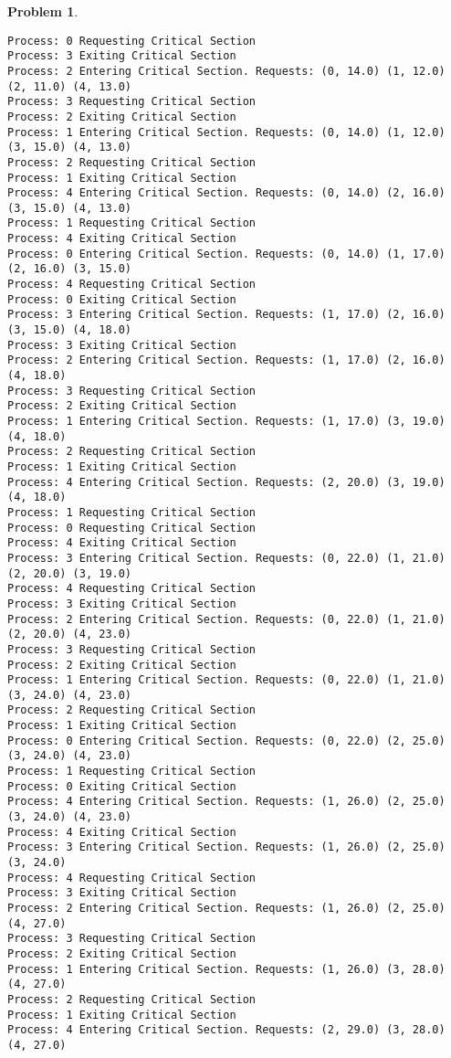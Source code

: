 \documentclass{article}
\theoremstyle{problemstyle}
\newtheorem{problem}{Problem}
\begin{document}
\begin{problem}
\begin{enumerate}[label=(\alph*)]
\begin{lstlisting}
Process: 0 Requesting Critical Section
Process: 3 Exiting Critical Section
Process: 2 Entering Critical Section. Requests: (0, 14.0) (1, 12.0) (2, 11.0) (4, 13.0)
Process: 3 Requesting Critical Section
Process: 2 Exiting Critical Section
Process: 1 Entering Critical Section. Requests: (0, 14.0) (1, 12.0) (3, 15.0) (4, 13.0)
Process: 2 Requesting Critical Section
Process: 1 Exiting Critical Section
Process: 4 Entering Critical Section. Requests: (0, 14.0) (2, 16.0) (3, 15.0) (4, 13.0)
Process: 1 Requesting Critical Section
Process: 4 Exiting Critical Section
Process: 0 Entering Critical Section. Requests: (0, 14.0) (1, 17.0) (2, 16.0) (3, 15.0)
Process: 4 Requesting Critical Section
Process: 0 Exiting Critical Section
Process: 3 Entering Critical Section. Requests: (1, 17.0) (2, 16.0) (3, 15.0) (4, 18.0)
Process: 3 Exiting Critical Section
Process: 2 Entering Critical Section. Requests: (1, 17.0) (2, 16.0) (4, 18.0)
Process: 3 Requesting Critical Section
Process: 2 Exiting Critical Section
Process: 1 Entering Critical Section. Requests: (1, 17.0) (3, 19.0) (4, 18.0)
Process: 2 Requesting Critical Section
Process: 1 Exiting Critical Section
Process: 4 Entering Critical Section. Requests: (2, 20.0) (3, 19.0) (4, 18.0)
Process: 1 Requesting Critical Section
Process: 0 Requesting Critical Section
Process: 4 Exiting Critical Section
Process: 3 Entering Critical Section. Requests: (0, 22.0) (1, 21.0) (2, 20.0) (3, 19.0)
Process: 4 Requesting Critical Section
Process: 3 Exiting Critical Section
Process: 2 Entering Critical Section. Requests: (0, 22.0) (1, 21.0) (2, 20.0) (4, 23.0)
Process: 3 Requesting Critical Section
Process: 2 Exiting Critical Section
Process: 1 Entering Critical Section. Requests: (0, 22.0) (1, 21.0) (3, 24.0) (4, 23.0)
Process: 2 Requesting Critical Section
Process: 1 Exiting Critical Section
Process: 0 Entering Critical Section. Requests: (0, 22.0) (2, 25.0) (3, 24.0) (4, 23.0)
Process: 1 Requesting Critical Section
Process: 0 Exiting Critical Section
Process: 4 Entering Critical Section. Requests: (1, 26.0) (2, 25.0) (3, 24.0) (4, 23.0)
Process: 4 Exiting Critical Section
Process: 3 Entering Critical Section. Requests: (1, 26.0) (2, 25.0) (3, 24.0)
Process: 4 Requesting Critical Section
Process: 3 Exiting Critical Section
Process: 2 Entering Critical Section. Requests: (1, 26.0) (2, 25.0) (4, 27.0)
Process: 3 Requesting Critical Section
Process: 2 Exiting Critical Section
Process: 1 Entering Critical Section. Requests: (1, 26.0) (3, 28.0) (4, 27.0)
Process: 2 Requesting Critical Section
Process: 1 Exiting Critical Section
Process: 4 Entering Critical Section. Requests: (2, 29.0) (3, 28.0) (4, 27.0)

\end{lstlisting}
\end{enumerate}
\end{problem}
\end{document}
